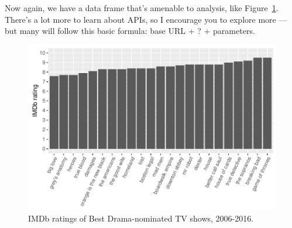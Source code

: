 \documentclass{article}\usepackage[]{graphicx}\usepackage[]{color}
\makeatletter
\def\maxwidth{ %
  \ifdim\Gin@nat@width>\linewidth
    \linewidth
  \else
    \Gin@nat@width
  \fi
}
\newenvironment{knitrout}{}{} %
\makeatother
\begin{document}
Now again, we have a data frame that's amenable to analysis, like Figure~\ref{fig:tvshows}. There's a lot more to learn about APIs, so I encourage you to explore more --- but many will follow this basic formula: base URL + ? + parameters. 

\begin{knitrout}
\color{fgcolor}\begin{figure}

{\centering \includegraphics[width=\maxwidth]{figure/tvshows-1} 

}

\caption[IMDb ratings of Best Drama-nominated TV shows, 2006-2016]{IMDb ratings of Best Drama-nominated TV shows, 2006-2016.}\label{fig:tvshows}
\end{figure}


\end{knitrout}




\end{document}
